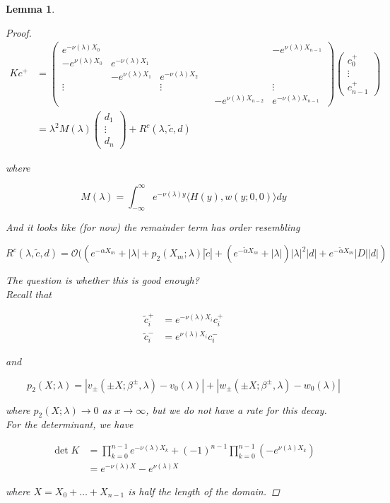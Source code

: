 \documentclass[12pt]{article}
\newtheorem{lemma}{Lemma}
\begin{document}
\begin{lemma}
\begin{proof}
\begin{align*}
K c^+ &= 
\begin{pmatrix}
e^{-\nu(\lambda)X_0} & & & & & -e^{\nu(\lambda)X_{n-1}} \\
-e^{\nu(\lambda)X_0} & e^{-\nu(\lambda)X_1} \\
& -e^{\nu(\lambda)X_1} & e^{-\nu(\lambda)X_2} \\
\vdots & & \vdots & &&  \vdots \\
& & & & -e^{\nu(\lambda)X_{n-2}} & e^{-\nu(\lambda)X_{n-1}} 
\end{pmatrix}
\begin{pmatrix}
c_0^+ \\ \vdots \\ c_{n-1}^+
\end{pmatrix} \\
&= \lambda^2 M(\lambda) \begin{pmatrix}
d_1 \\ \vdots \\ d_n
\end{pmatrix} + R^c(\lambda, \tilde{c},d)
\end{align*}

where

\[
M(\lambda) = \int_{-\infty}^\infty e^{-\nu(\lambda)y} \langle H(y), w(y; 0, 0) \rangle dy
\]

And it looks like (for now) the remainder term has order resembling

\[
R^c(\lambda, \tilde{c},d) = \mathcal{O}((e^{-\alpha X_m} + |\lambda| + p_2(X_m; \lambda)|\tilde{c}| + (e^{-\tilde{\alpha} X_m} + |\lambda|)|\lambda|^2|d| + e^{-\tilde{\alpha} X_m}|D||d| )
\]

The question is whether this is good enough?\\

Recall that

\begin{align*}
\tilde{c}_i^+ &= e^{-\nu(\lambda)X_i} c_i^+ \\ 
\tilde{c}_i^- &= e^{\nu(\lambda)X_i} c_i^-
\end{align*}

and

\[
p_2(X; \lambda) = |v_\pm(\pm X; \beta^\pm, \lambda) - v_0(\lambda)| + |w_\pm(\pm X; \beta^\pm, \lambda) - w_0(\lambda)|
\]

where $p_2(X; \lambda) \rightarrow 0$ as $x \rightarrow \infty$, but we do not have a rate for this decay.\\

For the determinant, we have

\begin{align*}
\det K &= \prod_{k = 0}^{n-1} e^{-\nu(\lambda)X_k} + (-1)^{n-1} \prod_{k = 0}^{n-1} (-e^{\nu(\lambda)X_k}) \\
&= e^{-\nu(\lambda) X} - e^{\nu(\lambda) X}
\end{align*}

where $X = X_0 + \dots + X_{n-1}$ is half the length of the domain.

\end{proof}
\end{lemma}
\end{document}

